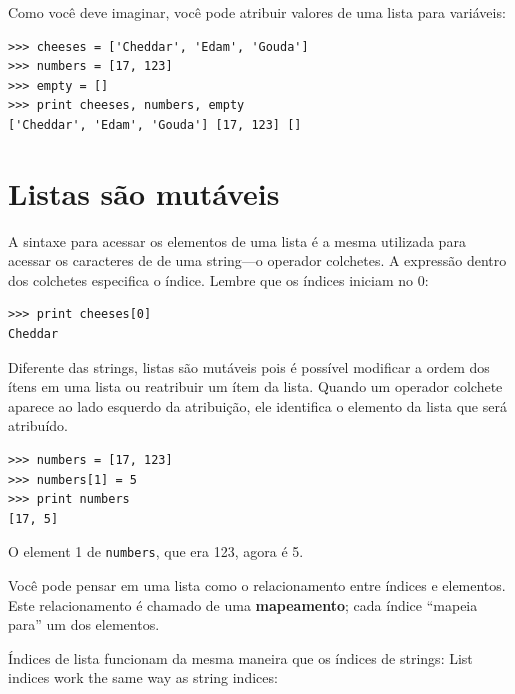 
Como você deve imaginar, você pode atribuir valores de uma lista para variáveis:

\beforeverb
\begin{verbatim}
>>> cheeses = ['Cheddar', 'Edam', 'Gouda']
>>> numbers = [17, 123]
>>> empty = []
>>> print cheeses, numbers, empty
['Cheddar', 'Edam', 'Gouda'] [17, 123] []
\end{verbatim}
\afterverb
%


\section{Listas são mutáveis}


A sintaxe para acessar os elementos de uma lista é a mesma utilizada
para acessar os caracteres de de uma string---o operador colchetes.
A expressão dentro dos colchetes especifica o índice. Lembre que os 
índices iniciam no 0:

\beforeverb
\begin{verbatim}
>>> print cheeses[0]
Cheddar
\end{verbatim}
\afterverb
%

Diferente das strings, listas são mutáveis pois é possível modificar a 
ordem dos ítens em uma lista ou reatribuir um ítem da lista.
Quando um operador colchete aparece ao lado esquerdo da atribuição, 
ele identifica o elemento da lista que será atribuído.


\beforeverb
\begin{verbatim}
>>> numbers = [17, 123]
>>> numbers[1] = 5
>>> print numbers
[17, 5]
\end{verbatim}
\afterverb
%
O element 1 de {\tt numbers}, que era 123, agora é 5.


Você pode pensar em uma lista como o relacionamento entre índices e
elementos. Este relacionamento é chamado de uma {\bf mapeamento}; cada
índice ``mapeia para'' um dos elementos.


Índices de lista funcionam da mesma maneira que os índices de strings:
List indices work the same way as string indices:

